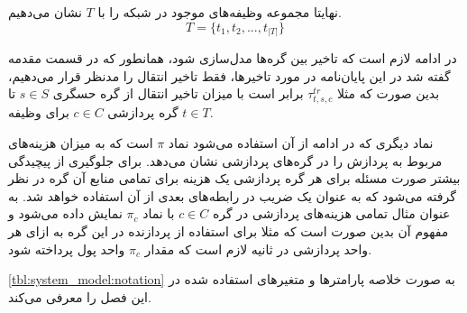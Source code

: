 	نهایتا مجموعه وظیفه‌های موجود در شبکه را  با $T$ نشان می‌دهیم. 
	\begin{equation}\label{eqn:def_sets_tasks}
	T = \{t_1, t_2, ..., t_{|T|}\}
	\end{equation}
	
	در ادامه لازم است که تاخیر بین گره‌ها مدل‌سازی شود، همانطور که در قسمت مقدمه گفته شد در این پایان‌نامه در مورد تاخیرها، فقط تاخیر انتقال را مدنظر قرار می‌دهیم، بدین صورت که مثلا $\tau_{t,s,c}^{tr}$ برابر است با میزان تاخیر انتقال از گره حسگری $s \in S$ تا گره پردازشی $c \in C$ برای وظیفه $t \in T$.
	
	نماد دیگری که در ادامه از آن استفاده می‌شود نماد $\pi$ است که به میزان هزینه‌های مربوط به پردازش را در گره‌های پردازشی نشان می‌دهد. برای جلوگیری از پیچیدگی بیشتر صورت مسئله برای هر گره پردازشی یک هزینه برای تمامی منابع آن گره در نظر گرفته می‌شود که به عنوان یک ضریب در رابطه‌های بعدی از آن استفاده خواهد شد. به عنوان مثال تمامی هزینه‌های پردازشی در گره $c \in C$ با نماد $\pi_c$ نمایش داده می‌شود و مفهوم آن بدین صورت است که مثلا برای استفاده از پردازنده در این گره به ازای هر واحد پردازشی در ثانیه لازم است که مقدار $\pi_c$ واحد پول پرداخته شود. 
	
	\cref{tbl:system_model:notation} به صورت خلاصه پارامتر‌ها و متغیر‌های استفاده شده در این فصل را معرفی می‌کند.

